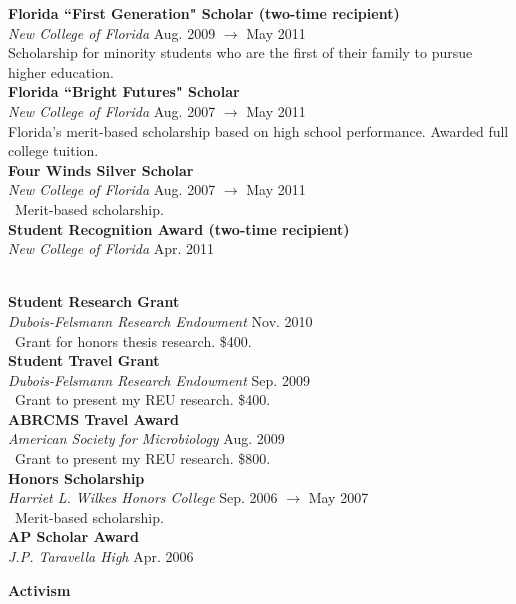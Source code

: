\documentclass[a4paper,12pt]{article}
\newcommand{\resheading}[1]{{\vspace*{.06in} \colorbox{mygrey}{\begin{minipage}{\textwidth}{\textmd{\large \textbf{#1} \vphantom{p\^{E}}}}\end{minipage}}} }
\newcommand{\ressubheading}[4]{
        \textbf{#1} \hfill #2\\
        \textit{#3} \hfill #4 \\}
\begin{document}
    \ressubheading{Florida ``First Generation" Scholar {\normalfont(two-time recipient)}}{}{New College of Florida}{Aug. 2009 $\rightarrow$ May 2011}
    Scholarship for minority students who are the first of their family to pursue higher education.\\

    \ressubheading{Florida ``Bright Futures" Scholar}{}{New College of Florida}{Aug. 2007 $\rightarrow$ May 2011}
    Florida's merit-based scholarship based on high school performance. Awarded full college tuition. \\

    \ressubheading{Four Winds Silver Scholar}{}{New College of Florida}{Aug. 2007 $\rightarrow$ May 2011}\
    Merit-based scholarship.\\
    
  \ressubheading{Student Recognition Award {\normalfont(two-time recipient)} }{}{New College of Florida} {Apr. 2011}\
    
    \ressubheading{Student Research Grant}{}{Dubois-Felsmann Research Endowment}{Nov. 2010}\
    Grant for honors thesis research. \$400.\\
    
    \ressubheading{Student Travel Grant}{}{Dubois-Felsmann Research Endowment}{Sep. 2009}\
    Grant to present my REU research. \$400.\\
    
    \ressubheading{ABRCMS Travel Award}{}{American Society for Microbiology}{Aug. 2009}\
    Grant to present my REU research. \$800.\\
    
    \ressubheading{Honors Scholarship}{}{Harriet L. Wilkes Honors College}{Sep. 2006 $\rightarrow$ May 2007}\
    Merit-based scholarship.\\
    
    \ressubheading{AP Scholar Award}{}{J.P. Taravella High}{Apr. 2006}




\resheading{Activism}
\end{document}
